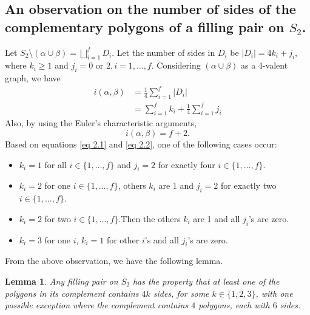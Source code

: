 \documentclass[11pt,reqno]{amsart}
\theoremstyle{plain}
\newtheorem{lemma}[theorem]{Lemma}
\theoremstyle{definition}
\theoremstyle{remark}
\numberwithin{equation}{section}
\numberwithin{figure}{section}
\begin{document}
\subsection*{An observation on the number of sides of the complementary polygons of a filling pair on \texorpdfstring{$S_2$}{TEXT}.} Let $S_2\setminus(\alpha\cup \beta) = \bigsqcup_{i=1}^f D_i$. Let the number of sides in $D_i$ be $|D_i|=4k_i + j_i$, where $k_i\geq 1$ and $j_i=0 \text{ or } 2 , i=1,\dots,f$. Considering $(\alpha\cup \beta)$ as a 4-valent graph, we have
\begin{align}\label{eq 2.1}
    i(\alpha,\beta)&=\frac{1}{4}\sum_{i=1}^f |D_i| \nonumber \\
    &=\sum_{i=1}^f k_i + \frac{1}{4}\sum_{i=1}^f j_i
\end{align}
Also, by using the Euler's characteristic arguments,
\begin{equation}\label{eq 2.2}
    i(\alpha,\beta)=f+2.
\end{equation}
Based on equations \eqref{eq 2.1} and \eqref{eq 2.2}, one of the following cases occur:
\begin{itemize}
    \item $k_i=1$ for all $i\in \{ 1,\dots,f\}$ and $j_i=2$ for exactly four $i\in \{ 1,\dots,f\}$.
    \item $k_i=2$ for one $i\in \{ 1,\dots,f\}$, others $k_i$ are 1 and $j_i=2$ for exactly two $i\in \{ 1,\dots,f\}$.
    \item $k_i=2$ for two $i\in \{ 1,\dots,f\}$.Then the others $k_i$ are 1 and all $j_i$'s are zero.
    \item $k_i=3$ for one $i$, $k_i=1$ for other $i$'s and all $j_i$'s are zero.
\end{itemize}
From the above observation, we have the following lemma.
\begin{lemma}
        Any filling pair on $S_2$ has the property that at least one of the polygons in its complement contains $4k$ sides, for some $k \in \{1,2,3\}$, with one possible exception where the complement contains $4$ polygons, each with $6$ sides.
\end{lemma}
\end{document}
